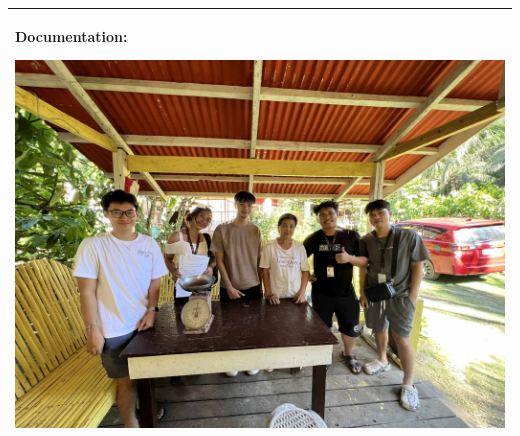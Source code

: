 {\begin{longtable}{|p{4cm}|p{10cm}|}
		\multicolumn{2}{|p{12cm}|}{%
		\textbf{Documentation: \vspace{0.4cm}} \par
		\includegraphics[width=\linewidth]{figures/documentation.jpg}%
		}                                \\ \hline
	\end{longtable}



}
